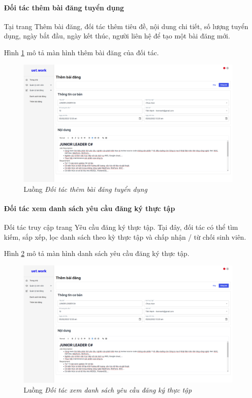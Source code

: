 \documentclass[./../main.tex]{subfiles}
\begin{document}
\paragraph*{Đối tác thêm bài đăng tuyển dụng}

Tại trang Thêm bài đăng, đối tác thêm tiêu đề, nội dung chi tiết, số lượng tuyển dụng, ngày bắt đầu, ngày kết thúc, người liên hệ để tạo một bài đăng mới.

Hình \ref{fig:add_post_page} mô tả màn hình thêm bài đăng của đối tác.

\begin{figure}[]
	\includegraphics[width=\linewidth]{./images/image18.png}
	\caption{Luồng \emph{Đối tác thêm bài đăng tuyển dụng}}
	\label{fig:add_post_page}
\end{figure}

\paragraph*{Đối tác xem danh sách yêu cầu đăng ký thực tập}

Đối tác truy cập trang Yêu cầu đăng ký thực tập. Tại đây, đối tác có thể tìm kiếm, sắp xếp, lọc danh sách theo kỳ thực tập và chấp nhận / từ chối sinh viên.

Hình \ref{fig:partner_view_list_requests_page} mô tả màn hình danh sách yêu cầu đăng ký thực tập.

\begin{figure}[]
	\includegraphics[width=\linewidth]{./images/image18.png} %
	\caption{Luồng \emph{Đối tác xem danh sách yêu cầu đăng ký thực tập}}
	\label{fig:partner_view_list_requests_page}
\end{figure}
\end{document}
